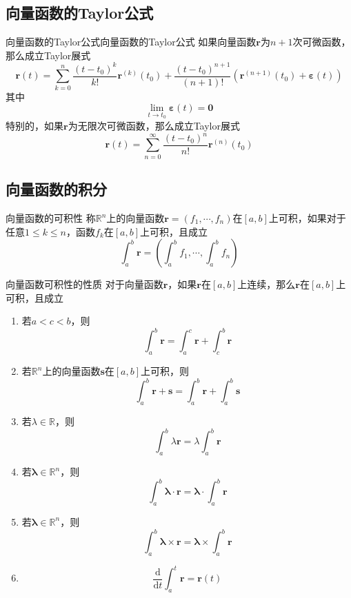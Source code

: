 \documentclass[lang = cn, scheme = chinese, thmcnt = section]{elegantbook}
\newcommand{\R}{\mathbb{R}}            %
\newcommand{\bs}{\boldsymbol}          %
\newcommand{\dd}{\mathrm{d}}           %
\begin{document}
\subsection{向量函数的Taylor公式}

\begin{theorem}{向量函数的Taylor公式}{向量函数的Taylor公式}
	如果向量函数$\bs{r}$为$n+1$次可微函数，那么成立Taylor展式
	$$
	\bs{r}(t)
	=\sum_{k=0}^{n}\frac{(t-t_0)^k}{k!}\bs{r}^{(k)}(t_0)
	+\frac{(t-t_0)^{n+1}}{(n+1)!}(\bs{r}^{(n+1)}(t_0)+\bs{\varepsilon}(t))
	$$
	其中
	$$
	\lim_{t\to t_0}\bs{\varepsilon}(t)=\bs{0}
	$$
	特别的，如果$\bs{r}$为无限次可微函数，那么成立Taylor展式
	$$
	\bs{r}(t)
	=\sum_{n=0}^{\infty}\frac{(t-t_0)^n}{n!}\bs{r}^{(n)}(t_0)
	$$
\end{theorem}

\subsection{向量函数的积分}

\begin{definition}{向量函数的可积性}
	称$\R^n$上的向量函数$\bs{r}=(f_1,\cdots,f_n)$在$[a,b]$上可积，如果对于任意$1\le k \le n$，函数$f_k$在$[a,b]$上可积，且成立
	$$
	\int_a^b \bs{r}=
	\left(\int_a^b f_1,\cdots,\int_a^b f_n\right)
	$$
\end{definition}

\begin{proposition}{向量函数可积性的性质}
	对于向量函数$\bs{r}$，如果$\bs{r}$在$[a,b]$上连续，那么$\bs{r}$在$[a,b]$上可积，且成立
	\begin{enumerate}
		\item 若$a<c<b$，则
		$$
		\int_a^b \bs{r}=\int_a^c \bs{r}+\int_c^b \bs{r}
		$$
		\item 若$\R^n$上的向量函数$\bs{s}$在$[a,b]$上可积，则
		$$
		\int_a^b \bs{r}+\bs{s}=\int_a^b \bs{r}+\int_a^b \bs{s}
		$$
		\item 若$\lambda\in \R$，则
		$$
		\int_a^b \lambda\bs{r}=\lambda \int_a^b \bs{r}
		$$
		\item 若$\bs{\lambda}\in \R^n$，则
		$$
		\int_a^b \bs{\lambda}\cdot \bs{r}=\bs{\lambda}\cdot \int_a^b \bs{r}
		$$
		\item 若$\bs{\lambda}\in \R^n$，则
		$$
		\int_a^b \bs{\lambda}\times \bs{r}=\bs{\lambda}\times \int_a^b \bs{r}
		$$
		\item 
		$$
		\frac{\dd}{\dd t}\int_a^t \bs{r}=\bs{r}(t)
		$$
	\end{enumerate}
\end{proposition}
\end{document}
